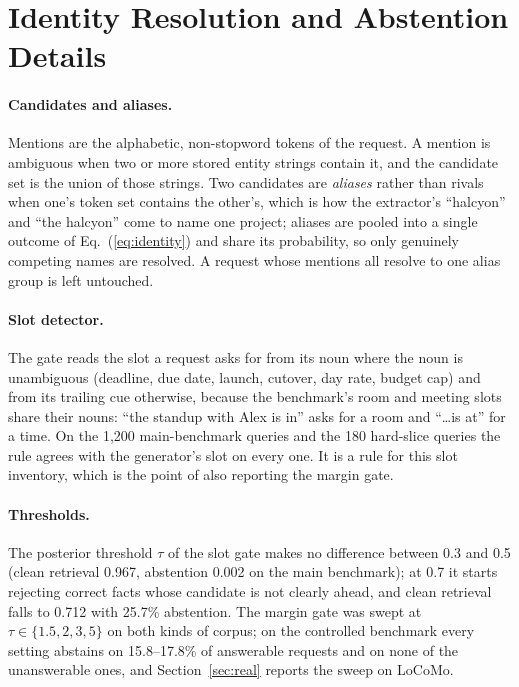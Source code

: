 \documentclass{article} %
\begin{document}
\section{Identity Resolution and Abstention Details}
\label{app:identity}

\paragraph{Candidates and aliases.} Mentions are the alphabetic, non-stopword tokens of the request. A mention is ambiguous when two or more stored entity strings contain it, and the candidate set is the union of those strings. Two candidates are \emph{aliases} rather than rivals when one's token set contains the other's, which is how the extractor's ``halcyon'' and ``the halcyon'' come to name one project; aliases are pooled into a single outcome of Eq.~(\ref{eq:identity}) and share its probability, so only genuinely competing names are resolved. A request whose mentions all resolve to one alias group is left untouched.

\paragraph{Slot detector.} The gate reads the slot a request asks for from its noun where the noun is unambiguous (deadline, due date, launch, cutover, day rate, budget cap) and from its trailing cue otherwise, because the benchmark's room and meeting slots share their nouns: ``the standup with Alex is in'' asks for a room and ``\ldots is at'' for a time. On the 1{,}200 main-benchmark queries and the 180 hard-slice queries the rule agrees with the generator's slot on every one. It is a rule for this slot inventory, which is the point of also reporting the margin gate.

\paragraph{Thresholds.} The posterior threshold $\tau$ of the slot gate makes no difference between 0.3 and 0.5 (clean retrieval 0.967, abstention 0.002 on the main benchmark); at 0.7 it starts rejecting correct facts whose candidate is not clearly ahead, and clean retrieval falls to 0.712 with 25.7\% abstention. The margin gate was swept at $\tau\in\{1.5,2,3,5\}$ on both kinds of corpus; on the controlled benchmark every setting abstains on 15.8--17.8\% of answerable requests and on none of the unanswerable ones, and Section~\ref{sec:real} reports the sweep on LoCoMo.
\end{document}
